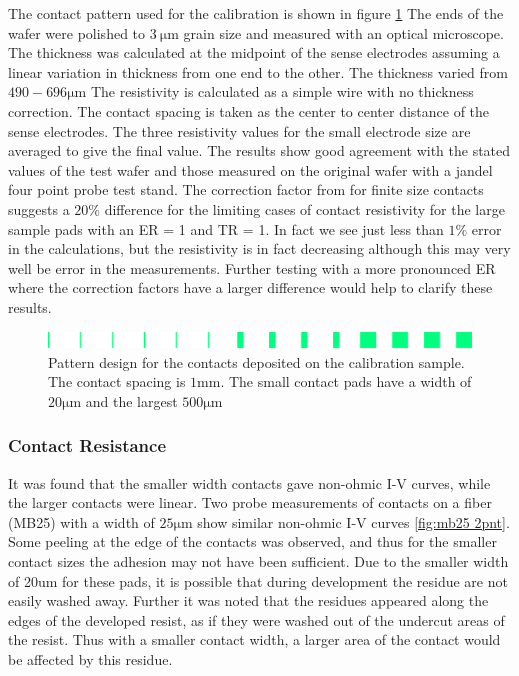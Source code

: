 The contact pattern used for the calibration is shown in figure \ref{fig:testwafer} The ends of the wafer were polished to $\SI{3}{\micro\meter}$ grain size and measured with an optical microscope. The thickness was calculated at the midpoint of the sense electrodes assuming a linear variation in thickness from one end to the other. The thickness varied from $490 - 696 \si{\micro \meter}$ The resistivity is calculated as a simple wire with no thickness correction. The contact spacing is taken as the center to center distance of the sense electrodes. The three resistivity values for the small electrode size are averaged to give the final value. The results show good agreement with the stated values of the test wafer and those measured on the original wafer with a jandel four point probe test stand.  The correction factor from \cite{Zimney2007CorrectionStudy} for finite size contacts suggests a $20\%$ difference for the limiting cases of contact resistivity for the large sample pads with an ER = 1 and TR = 1. In fact we see just less than $1\%$ error in the calculations, but the resistivity is in fact decreasing although this may very well be error in the measurements. Further testing with a more pronounced ER where the correction factors have a larger difference would help to clarify these results. 


\begin{figure}[!htb]
    \centering
    \includegraphics[width=\textwidth]{fig/Results/testwafer.png}
    \caption{Pattern design for the contacts deposited on the calibration sample. The contact spacing is $1\si{\mm}$. The small contact pads have a width of $20\si{\micro\meter}$ and the largest $500\si{\micro\meter}$  }
    \label{fig:testwafer}
\end{figure}

\subsubsection{Contact Resistance}
It was found that the smaller width contacts gave non-ohmic I-V curves, while the larger contacts were linear. Two probe measurements of contacts on a fiber (MB25) with a width of $ 25 \si{\micro\meter}$ show similar non-ohmic I-V curves \ref{fig:mb25 2pnt}. Some peeling at the edge of the contacts was observed, and thus for the smaller contact sizes the adhesion may not have been sufficient. Due to the smaller width of 20um for these pads, it is possible that during development the residue are not easily washed away. Further it was noted that the residues appeared along the edges of the developed resist, as if they were washed out of the undercut areas of the resist. Thus with a smaller contact width, a larger area of the contact would be affected by this residue. 



